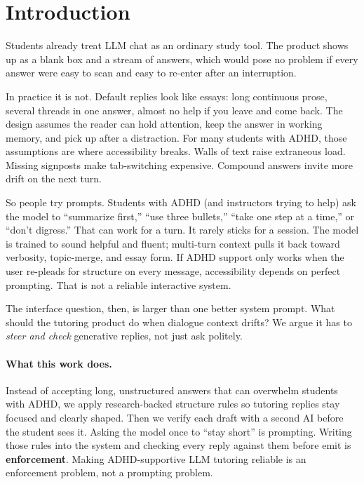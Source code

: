 \section{Introduction}
\label{sec:intro}

Students already treat LLM chat as an ordinary study tool. The product shows
up as a blank box and a stream of answers, which would pose no problem if
every answer were easy to scan and easy to re-enter after an interruption.

In practice it is not. Default replies look like essays: long continuous prose, several
threads in one answer, almost no help if you leave and come back. The design
assumes the reader can hold attention, keep the answer in working memory, and
pick up after a distraction. For many students with ADHD, those assumptions
are where accessibility breaks. Walls of text raise extraneous load. Missing
signposts make tab-switching expensive. Compound answers invite more drift on
the next turn.

So people try prompts. Students with ADHD (and instructors trying to help) ask
the model to ``summarize first,'' ``use three bullets,'' ``take one step at a
time,'' or ``don't digress.'' That can work for a turn. It rarely sticks for a
session. The model is trained to sound helpful and fluent; multi-turn context
pulls it back toward verbosity, topic-merge, and essay form. If ADHD support
only works when the user re-pleads for structure on every message,
accessibility depends on perfect prompting. That is not a reliable interactive
system.

The interface question, then, is larger than one better system prompt. What
should the tutoring product do when dialogue context drifts? We argue it has
to \emph{steer and check} generative replies, not just ask politely.

\paragraph{What this work does.}
Instead of accepting long, unstructured answers that can overwhelm students
with ADHD, we apply research-backed structure rules so tutoring replies stay
focused and clearly shaped. Then we verify each draft with a second AI before
the student sees it. Asking the model once to ``stay short'' is prompting.
Writing those rules into the system and checking every reply against them
before emit is \textbf{enforcement}. Making ADHD-supportive LLM tutoring
reliable is an enforcement problem, not a prompting problem.

